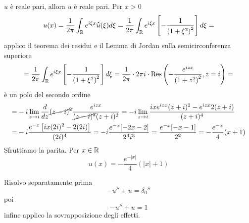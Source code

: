 $\hat{u}$ è reale pari, allora $u$ è reale pari. Per $x > 0$
\begin{equation*}
u(x) = \frac{1}{2\pi }\int _{\mathbb{R} } e^{i\xi x}\widehat{u}(\xi) d\xi = \frac{1}{2\pi }\int _{\mathbb{R} } e^{i\xi x}\left[ - \frac{1}{\left(1 + \xi ^{2}\right)^{2}}\right] d\xi =
\end{equation*}
applico il teorema dei residui e il Lemma di Jordan sulla semicirconferenza superiore
\begin{equation*}
= \frac{1}{2\pi }\int _{\mathbb{R} } e^{i\xi x}\left[ - \frac{1}{\left(1 + \xi ^{2}\right)^{2}}\right] d\xi = \frac{1}{2\pi } \cdot 2\pi i\cdot \operatorname{Res} \left(- \frac{e^{izx}}{\left(1 + z^{2}\right)^{2}} ,z = i\right) =
\end{equation*}
è un polo del secondo ordine
\begin{equation*}
\begin{aligned}
= & - i\lim\limits _{z\rightarrow i}\frac{d}{dz}\cancel{(z - i)^{2}}\frac{e^{izx}}{\cancel{(z - i)^{2}}(z + i)^{2}} = - i\lim\limits _{z\rightarrow i}\frac{ixe^{izx}(z + i)^{2} - e^{izx} 2(z + i)}{(z + i)^{4}}\\
= & - i\frac{e^{ - x}\left[ ix(2i)^{2} - 2(2i)\right]}{(2i)^{4}} = - i\frac{e^{ - x}[ - 2x - 2]}{2^{3} i^{3}} = \frac{e^{ - x}[ - x - 1]}{2^{2}} = - \frac{e^{ - x}}{4}(x + 1)
\end{aligned}
\end{equation*}
Sfruttiamo la parita. Per $x\in \mathbb{R} $
\begin{equation*}
u(x) = - \frac{e^{ - | x| }}{4}(| x| + 1)
\end{equation*}
\Soluzione

Risolvo separatamente prima
\begin{equation*}
- u'' + u = \delta _{0} ''
\end{equation*}
poi
\begin{equation*}
- u'' + u = 1
\end{equation*}
infine applico la sovrapposizione degli effetti.

